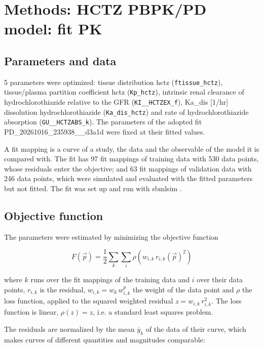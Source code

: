 \section{Methods: HCTZ PBPK/PD model: fit PK}

\subsection{Parameters and data}

5 parameters were optimized: tissue distribution hctz (\texttt{ftissue\_hctz}), tissue/plasma partition coefficient hctz (\texttt{Kp\_hctz}), intrinsic renal clearance of hydrochlorothiazide relative to the GFR (\texttt{KI\_\_HCTZEX\_f}), Ka\_dis [1/hr] dissolution hydrochlorothiazide (\texttt{Ka\_dis\_hctz}) and rate of hydrochlorothiazide absorption (\texttt{GU\_\_HCTZABS\_k}). The parameters of the adopted fit PD\_20261016\_235938\_\_d3a1d were fixed at their fitted values.

A fit mapping is a curve of a study, the data and the observable of the model it is compared with. The fit has 97 fit mappings of training data with 530 data points, whose residuals enter the objective; and 63 fit mappings of validation data with 246 data points, which were simulated and evaluated with the fitted parameters but not fitted. The fit was set up and run with sbmlsim \cite{Koenig2026_sbmlsim}.

\subsection{Objective function}

The parameters were estimated by minimizing the objective function

\begin{equation}
F(\vec{p}) = \frac{1}{2} \sum_{k} \sum_{i} \rho\left(w_{i,k}\, r_{i,k}(\vec{p})^2\right)
\end{equation}

where $k$ runs over the fit mappings of the training data and $i$ over their data points, $r_{i,k}$ is the residual, $w_{i,k} = w_k\, w^{p}_{i,k}$ the weight of the data point and $\rho$ the loss function, applied to the squared weighted residual $z = w_{i,k}\, r_{i,k}^2$. The loss function is linear, $\rho(z) = z$, i.e. a standard least squares problem.

The residuals are normalized by the mean $\overline{y}_k$ of the data of their curve, which makes curves of different quantities and magnitudes comparable:

